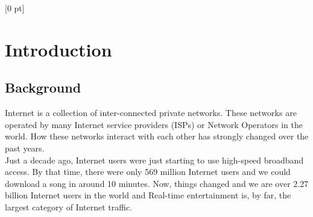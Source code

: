 \titlespacing{\chapter}{0 pt}{30 pt}{50 pt}[0 pt]
\titleformat{\section}{\Large\bfseries}{\thesection}{0 pt}{\hspace{30 pt}}
\titleformat{\subsection}{\large\bfseries}{\thesubsection}{0 pt}{\hspace{30 pt}}
\pagestyle{fancy}
\renewcommand{\chaptername}{CHAPTER}
\fancyhead[LO,LE]{\footnotesize\textit{\leftmark}}
\fancyhead[RO,RE]{\thepage}
\fancyfoot[CO,CE]{}
\chapter{Introduction} %
\normalsize
\section{Background}
\vspace{30 pt}
\noindent
Internet is a collection of inter-connected private networks. These networks are operated by many Internet service providers (ISPs) or Network Operators in the world. How these networks interact with each other has strongly changed over the past years.\\

Just a decade ago, Internet users were just starting to use high-speed broadband access. By that time, there were only 569 million Internet users and we could download a song in around 10 minutes. Now, things changed and we are over 2.27 billion Internet users in the world and Real-time entertainment is, by far, the largest category of Internet traffic. \\


